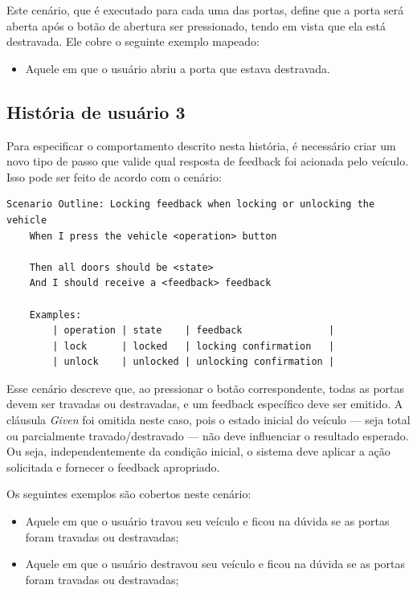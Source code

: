 Este cenário, que é executado para cada uma das portas, define que a porta será aberta após o botão de abertura ser pressionado, tendo em vista que ela 
está destravada. Ele cobre o seguinte exemplo mapeado:

\begin{itemize}
    \item Aquele em que o usuário abriu a porta que estava destravada.
\end{itemize}


\subsection{História de usuário 3}

Para especificar o comportamento descrito nesta história, é necessário criar um novo tipo de passo que valide qual resposta de feedback foi acionada pelo veículo. 
Isso pode ser feito de acordo com o cenário:

\begin{verbatim}
Scenario Outline: Locking feedback when locking or unlocking the vehicle
    When I press the vehicle <operation> button

    Then all doors should be <state>
    And I should receive a <feedback> feedback

    Examples:
        | operation | state    | feedback               |
        | lock      | locked   | locking confirmation   |
        | unlock    | unlocked | unlocking confirmation |
\end{verbatim}

Esse cenário descreve que, ao pressionar o botão correspondente, todas as portas devem ser travadas ou destravadas, e um feedback específico deve ser emitido. A cláusula \textit{Given} foi omitida neste caso, pois o estado inicial do veículo — seja total ou parcialmente travado/destravado — não deve influenciar 
o resultado esperado. Ou seja, independentemente da condição inicial, o sistema deve aplicar a ação solicitada e fornecer o feedback apropriado.

Os seguintes exemplos são cobertos neste cenário:

\begin{itemize}
    \item Aquele em que o usuário travou seu veículo e ficou na dúvida se as portas foram travadas ou destravadas;
    \item Aquele em que o usuário destravou seu veículo e ficou na dúvida se as portas foram travadas ou destravadas;
\end{itemize}

